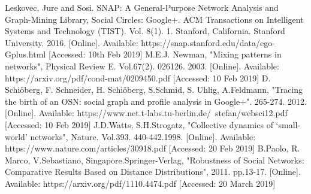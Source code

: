 \documentclass[a4paper, 10pt, conference]{ieeeconf}      %
\begin{document}
\begin{thebibliography}{99}
Leskovec, Jure and Sosi. SNAP: A General-Purpose Network Analysis and Graph-Mining Library, Social Circles: Google+. ACM Transactions on Intelligent Systems and Technology (TIST). Vol. 8(1). 1. Stanford, California. Stanford University. 2016. [Online]. Available: https://snap.stanford.edu/data/ego-Gplus.html  [Accessed: 10th Feb 2019]
M.E.J. Newman, "Mixing patterns in networks", Physical Review E. Vol.67(2). 026126. 2003. [Online]. Available: https://arxiv.org/pdf/cond-mat/0209450.pdf  [Accessed: 10 Feb 2019]
D. Schi\"oberg, F. Schneider, H. Schi\"oberg, S.Schmid, S. Uhlig, A.Feldmann, "Tracing the birth of an OSN: social graph and profile analysis in Google+". 265-274. 2012. [Online]. Available: https://www.net.t-labs.tu-berlin.de/~stefan/websci12.pdf   [Accessed: 10 Feb 2019]
J.D.Watts, S.H.Strogatz, "Collective dynamics of ‘small-world’ networks", Nature. Vol.393. 440-442.1998. [Online]. Available: https://www.nature.com/articles/30918.pdf  [Accessed: 20 Feb 2019]
B.Paolo, R. Marco, V.Sebastiano, Singapore.Springer-Verlag, "Robustness of Social Networks: Comparative Results Based on Distance Distributions", 2011. pp.13-17. [Online]. Available: https://arxiv.org/pdf/1110.4474.pdf [Accessed: 20 March 2019]

\end{thebibliography}
\end{document}
